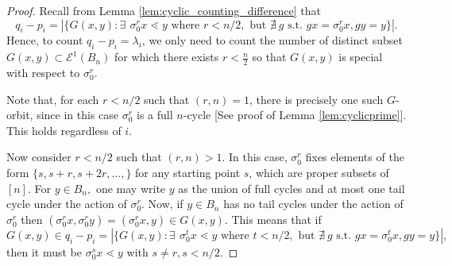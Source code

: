\documentclass[10 pt]{amsart}
\theoremstyle{plain}
\theoremstyle{definition}
\theoremstyle{remark}
\numberwithin{equation}{section}
\theoremstyle{remark}
\begin{document}
\begin{proof} 

Recall from Lemma \ref{lem:cyclic_counting_difference} that 
 $$q_i - p_i =|\{G{(x , y)} : \exists \: \, \sigma_0^r x \lessdot y \text{ where } r < n/2, \text{ but } \nexists \:  g \text{ s.t. } g x = \sigma_0 ^r x, g y = y \}|.$$ 
Hence, to count $q_i - p_i = \lambda_i $, we only need to count the number of distinct subset $G(x, y) \subset \mathcal E^1(B_n)$ for which there exists $r < \frac n 2$ so that $G(x, y)$ is special with respect to $\sigma_0^r.$

Note that, for each $r < n/2$ such that $(r, n) = 1$, there is precisely one such $G$-orbit, since in this case $\sigma_0^r$ is a full $n$-cycle [See proof of Lemma \ref{lem:cyclicprime}]. 
This holds regardless of $i$. 

Now consider $r < n/2$ such that $(r, n) > 1$. In this case, $\sigma_0^r$ fixes elements of the form $\{s, s+r, s+2r, ..., \}$ for any starting point $s$, which are proper subsets of $[n]$. For $y \in B_n,$ one may write $y$ as the union of full cycles and at most one tail cycle under the action of $\sigma_0^r$. Now, if $y \in B_n$ has no tail cycles under the action of $\sigma_0^r$ then $(\sigma_0^rx , \sigma_0^ry)= (\sigma_0^rx , y) \in G(x, y).$ This means that if $G(x, y)\in q_i - p_i =|\{G{(x, y)} : \exists \: \, \sigma_0^t x \lessdot y \text{ where } t < n/2, \text{ but } \nexists \:  g \text{ s.t. } g x = \sigma_0 ^t x, g y = y \}|,$ then it must be $\sigma_0^s x \lessdot y$ with $s \neq r, s < n/2.$


\end{proof}
\end{document}
